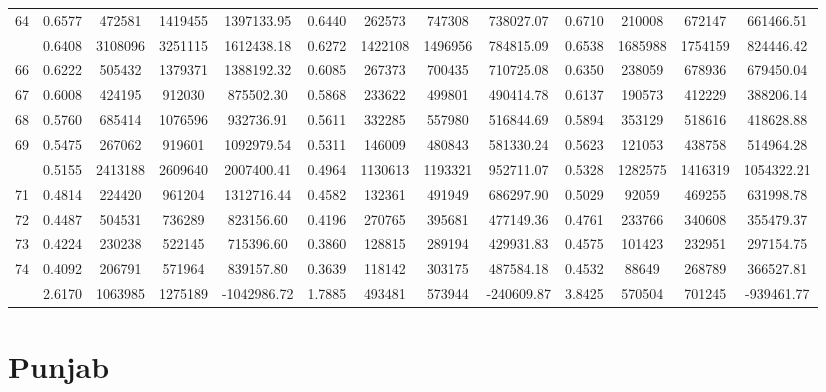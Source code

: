\documentclass[
  12pt,
]{article}
\begin{document}
\begin{longtable}[t]{lcccccccccccc}
64 & 0.6577 & 472581 & 1419455 & 1397133.95 & 0.6440 & 262573 & 747308 & 738027.07 & 0.6710 & 210008 & 672147 & 661466.51\\
\addlinespace
65 & 0.6408 & 3108096 & 3251115 & 1612438.18 & 0.6272 & 1422108 & 1496956 & 784815.09 & 0.6538 & 1685988 & 1754159 & 824446.42\\
66 & 0.6222 & 505432 & 1379371 & 1388192.32 & 0.6085 & 267373 & 700435 & 710725.08 & 0.6350 & 238059 & 678936 & 679450.04\\
67 & 0.6008 & 424195 & 912030 & 875502.30 & 0.5868 & 233622 & 499801 & 490414.78 & 0.6137 & 190573 & 412229 & 388206.14\\
68 & 0.5760 & 685414 & 1076596 & 932736.91 & 0.5611 & 332285 & 557980 & 516844.69 & 0.5894 & 353129 & 518616 & 418628.88\\
69 & 0.5475 & 267062 & 919601 & 1092979.54 & 0.5311 & 146009 & 480843 & 581330.24 & 0.5623 & 121053 & 438758 & 514964.28\\
\addlinespace
70 & 0.5155 & 2413188 & 2609640 & 2007400.41 & 0.4964 & 1130613 & 1193321 & 952711.07 & 0.5328 & 1282575 & 1416319 & 1054322.21\\
71 & 0.4814 & 224420 & 961204 & 1312716.44 & 0.4582 & 132361 & 491949 & 686297.90 & 0.5029 & 92059 & 469255 & 631998.78\\
72 & 0.4487 & 504531 & 736289 & 823156.60 & 0.4196 & 270765 & 395681 & 477149.36 & 0.4761 & 233766 & 340608 & 355479.37\\
73 & 0.4224 & 230238 & 522145 & 715396.60 & 0.3860 & 128815 & 289194 & 429931.83 & 0.4575 & 101423 & 232951 & 297154.75\\
74 & 0.4092 & 206791 & 571964 & 839157.80 & 0.3639 & 118142 & 303175 & 487584.18 & 0.4532 & 88649 & 268789 & 366527.81\\
\addlinespace
75 & 2.6170 & 1063985 & 1275189 & -1042986.72 & 1.7885 & 493481 & 573944 & -240609.87 & 3.8425 & 570504 & 701245 & -939461.77\\*
\end{longtable}
\endgroup{}

\pagebreak

\hypertarget{punjab}{%
\section{Punjab}\label{punjab}}

\begingroup\fontsize{9.7}{11.7}\selectfont
\end{document}
